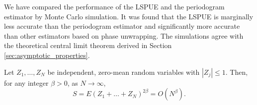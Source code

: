 \documentclass[journal]{IEEEtran}
\begin{document}
We have compared the performance of the LSPUE and the periodogram estimator
\cite{Rife1974} by Monte Carlo simulation.  It was found that the LSPUE is
marginally less accurate than the periodogram estimator and significantly more
accurate than other estimators based on phase unwrapping.  The simulations
agree with the theoretical central limit theorem derived in Section
\ref{sec:asymptotic_properties}.


%
\small



\appendix

\begin{lemma} \label{lem:zero_mean_indepent_sum_bound}
  Let $Z_1, \dots, Z_N$ be independent, zero-mean random variables with $|Z_j|
  \leq 1$.  Then, for any integer $\beta > 0$, as $N \rightarrow \infty$,
\begin{equation*}
  S = E(Z_1 + \dots + Z_N)^{2 \beta} = O(N^\beta).
\end{equation*}
\end{lemma}
\end{document}
